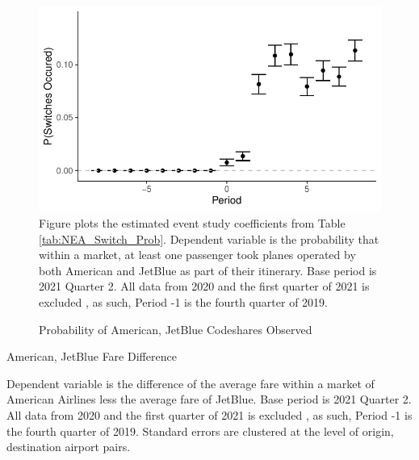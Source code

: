 \documentclass{article}
\begin{document}
\begin{appendices}
	\begin{figure}
		\caption{Probability of American, JetBlue Codeshares Observed}
		\label{tab:NEA_Switch_Graph}
		\includegraphics[width = \linewidth]{NEA_Probability_Switches_Graph}
		\footnotesize{Figure plots the estimated event study coefficients from Table \ref{tab:NEA_Switch_Prob}. Dependent variable is the probability that within a market, at least one passenger took planes operated by both American and JetBlue as part of their itinerary. Base period is 2021 Quarter 2. All data from 2020 and the first quarter of 2021 is excluded , as such,  Period -1 is the fourth quarter of 2019.}
	\end{figure}
	
	\begin{table}
		\caption{American, JetBlue Fare Difference}
		\label{tab:NEA_Fare_Neutral}
		
		\footnotesize{Dependent variable is the difference of the average fare within a market of American Airlines less the average fare of JetBlue. Base period is 2021 Quarter 2. All data from 2020 and the first quarter of 2021 is excluded , as such,  Period -1 is the fourth quarter of 2019. Standard errors are clustered at the level of origin, destination airport pairs.}
	\end{table}
	

\end{appendices}
\end{document}
